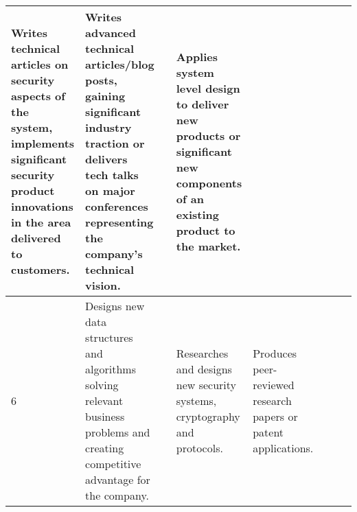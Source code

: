 \documentclass{article}
\begin{document}
\begin{center}
\begin{tabular}{ | m{15em} | m{15em} | m{15em} |  m{15em} | m{15em} |  m{15em} | m{15em} | m{15em} |}
    Writes technical articles on security aspects of the system, implements significant security product innovations in the area delivered to customers.&
    Writes advanced technical articles/blog posts, gaining significant industry traction or delivers tech talks on major conferences representing the company's technical vision.
    & &
    Applies system level design to deliver new products or significant new components of an existing product to the market.
    & \\
  \hline
    6&
    Designs new data structures and algorithms solving relevant business problems and creating competitive advantage for the company.&
    &
    Researches and designs new security systems, cryptography and protocols.&
    Produces peer-reviewed research papers or patent applications.
    & & & \\
\end{tabular}
\end{center}
\end{document}
